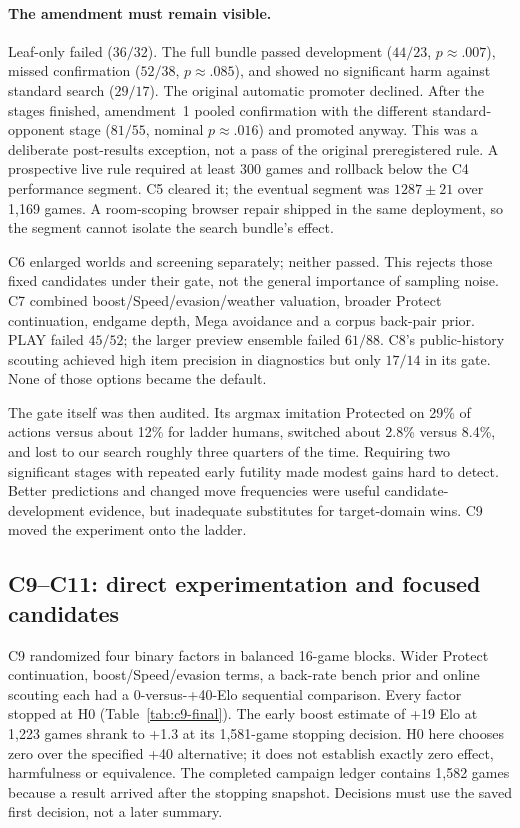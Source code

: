 \paragraph{The amendment must remain visible.}
Leaf-only failed ($36/32$). The full bundle passed development
($44/23$, $p\approx.007$), missed confirmation ($52/38$, $p\approx.085$),
and showed no significant harm against standard search ($29/17$).
The original automatic promoter declined. After the stages finished,
amendment~1 pooled confirmation with the different standard-opponent stage
($81/55$, nominal $p\approx.016$) and promoted anyway. This was a deliberate
post-results exception, not a pass of the original preregistered rule.
A prospective live rule required at least 300 games and rollback below the
C4 performance segment. C5 cleared it; the eventual segment was
$1287\pm21$ over 1,169 games. A room-scoping browser repair shipped in the
same deployment, so the segment cannot isolate the search bundle's effect.

C6 enlarged worlds and screening separately; neither passed. This rejects
those fixed candidates under their gate, not the general importance of
sampling noise. C7 combined boost/Speed/evasion/weather valuation, broader
Protect continuation, endgame depth, Mega avoidance and a corpus back-pair
prior. PLAY failed $45/52$; the larger preview ensemble failed $61/88$.
C8's public-history scouting achieved high item precision in diagnostics but
only $17/14$ in its gate. None of those options became the default.

The gate itself was then audited. Its argmax imitation Protected on 29\% of
actions versus about 12\% for ladder humans, switched about 2.8\% versus
8.4\%, and lost to our search roughly three quarters of the time. Requiring
two significant stages with repeated early futility made modest gains hard
to detect. Better predictions and changed move frequencies were useful
candidate-development evidence, but inadequate substitutes for target-domain
wins. C9 moved the experiment onto the ladder.


\subsection{C9--C11: direct experimentation and focused candidates}
C9 randomized four binary factors in balanced 16-game blocks. Wider Protect
continuation, boost/Speed/evasion terms, a back-rate bench prior and online
scouting each had a 0-versus-+40-Elo sequential comparison. Every factor
stopped at H0 (Table~\ref{tab:c9-final}). The early boost estimate of +19 Elo
at 1,223 games shrank to +1.3 at its 1,581-game stopping decision. H0 here
chooses zero over the specified +40 alternative; it does not establish
exactly zero effect, harmfulness or equivalence. The completed campaign
ledger contains 1,582 games because a result arrived after the stopping
snapshot. Decisions must use the saved first decision, not a later summary.

